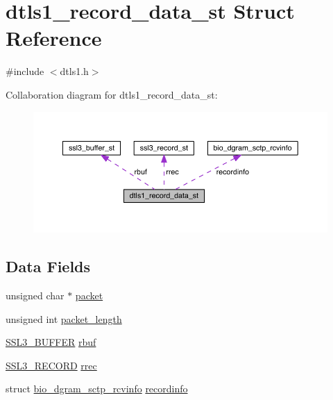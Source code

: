 \hypertarget{structdtls1__record__data__st}{}\section{dtls1\+\_\+record\+\_\+data\+\_\+st Struct Reference}
\label{structdtls1__record__data__st}


{\ttfamily \#include $<$dtls1.\+h$>$}



Collaboration diagram for dtls1\+\_\+record\+\_\+data\+\_\+st\+:\nopagebreak
\begin{figure}[H]
\begin{center}
\leavevmode
\includegraphics[width=350pt]{structdtls1__record__data__st__coll__graph}
\end{center}
\end{figure}
\subsection*{Data Fields}
\begin{DoxyCompactItemize}
\item 
unsigned char $\ast$ \hyperlink{structdtls1__record__data__st_a724f5bddffc45b222ae90da09d6c8628}{packet}
\item 
unsigned int \hyperlink{structdtls1__record__data__st_adeb7e6beb692f86e02431fbd430d92a1}{packet\+\_\+length}
\item 
\hyperlink{include_2openssl_2ssl3_8h_a83f21b8b26819013daff26a110d590a8}{S\+S\+L3\+\_\+\+B\+U\+F\+F\+ER} \hyperlink{structdtls1__record__data__st_a9a1d2af51256a2a27b1b5b12d3b8e6ee}{rbuf}
\item 
\hyperlink{include_2openssl_2ssl3_8h_a79995c4da12258c4a4a1c028e319f7ea}{S\+S\+L3\+\_\+\+R\+E\+C\+O\+RD} \hyperlink{structdtls1__record__data__st_a4f4654e61a104fc84503bb658507d673}{rrec}
\item 
struct \hyperlink{structbio__dgram__sctp__rcvinfo}{bio\+\_\+dgram\+\_\+sctp\+\_\+rcvinfo} \hyperlink{structdtls1__record__data__st_a0089d43b7c64e871febcfe7a79ce286d}{recordinfo}
\end{DoxyCompactItemize}


